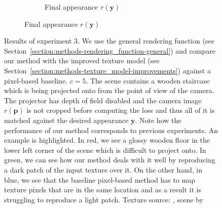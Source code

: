 \begin{figure}[]
\begin{subfigure}{\textwidth}
\begin{subfigure}{0.19\textwidth}
            \caption{Final appearance \(r(\bm{y})\)}
            \vspace*{5.0mm}
            \label{fig:ex03-staircase_illum-beams-pixel_proj}
        \end{subfigure}
    \end{subfigure}
    \caption{Results of experiment 3. We use the general rendering function (see Section~\ref{section:methods-rendering_function-general}) and compare our method with the improved texture model (see Section~\ref{section:methods-texture_model-improvements}) against a pixel-based baseline. \(c = 5\). The scene contains a wooden staircase which is being projected onto from the point of view of the camera. The projector has depth of field disabled and the camera image \(r(\bm{p})\) is not cropped before computing the loss and thus all of it is matched against the desired appearance \(\bm{y}\). Note how the performance of our method corresponds to previous experiments. An example is highlighted. In red, we see a glossy wooden floor in the lower left corner of the scene which is difficult to project onto. In green, we can see how our method deals with it well by reproducing a dark patch of the input texture over it. On the other hand, in blue, we see that the baseline pixel-based method has to map texture pixels that are in the same location and as a result it is struggling to reproduce a light patch. Texture source: \citet{Pixar128}, scene by \citet{Bitterli16}}
    \label{fig:ex03-staircase_illum}
\end{figure}

